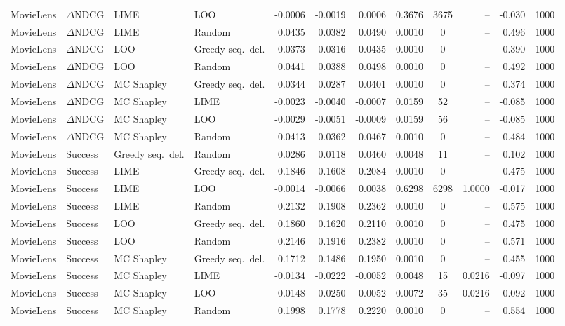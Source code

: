 \begin{longtable}{@{}p{}p{}p{}p{}rrrrcrrr@{}}
MovieLens & $\Delta$NDCG & LIME & LOO & -0.0006 & -0.0019 & 0.0006 & 0.3676 & 3675 & -- & -0.030 & 1000 \\
MovieLens & $\Delta$NDCG & LIME & Random & 0.0435 & 0.0382 & 0.0490 & 0.0010 & 0 & -- & 0.496 & 1000 \\
MovieLens & $\Delta$NDCG & LOO & Greedy seq.\ del. & 0.0373 & 0.0316 & 0.0435 & 0.0010 & 0 & -- & 0.390 & 1000 \\
MovieLens & $\Delta$NDCG & LOO & Random & 0.0441 & 0.0388 & 0.0498 & 0.0010 & 0 & -- & 0.492 & 1000 \\
MovieLens & $\Delta$NDCG & MC Shapley & Greedy seq.\ del. & 0.0344 & 0.0287 & 0.0401 & 0.0010 & 0 & -- & 0.374 & 1000 \\
MovieLens & $\Delta$NDCG & MC Shapley & LIME & -0.0023 & -0.0040 & -0.0007 & 0.0159 & 52 & -- & -0.085 & 1000 \\
MovieLens & $\Delta$NDCG & MC Shapley & LOO & -0.0029 & -0.0051 & -0.0009 & 0.0159 & 56 & -- & -0.085 & 1000 \\
MovieLens & $\Delta$NDCG & MC Shapley & Random & 0.0413 & 0.0362 & 0.0467 & 0.0010 & 0 & -- & 0.484 & 1000 \\
MovieLens & Success & Greedy seq.\ del. & Random & 0.0286 & 0.0118 & 0.0460 & 0.0048 & 11 & -- & 0.102 & 1000 \\
MovieLens & Success & LIME & Greedy seq.\ del. & 0.1846 & 0.1608 & 0.2084 & 0.0010 & 0 & -- & 0.475 & 1000 \\
MovieLens & Success & LIME & LOO & -0.0014 & -0.0066 & 0.0038 & 0.6298 & 6298 & 1.0000 & -0.017 & 1000 \\
MovieLens & Success & LIME & Random & 0.2132 & 0.1908 & 0.2362 & 0.0010 & 0 & -- & 0.575 & 1000 \\
MovieLens & Success & LOO & Greedy seq.\ del. & 0.1860 & 0.1620 & 0.2110 & 0.0010 & 0 & -- & 0.475 & 1000 \\
MovieLens & Success & LOO & Random & 0.2146 & 0.1916 & 0.2382 & 0.0010 & 0 & -- & 0.571 & 1000 \\
MovieLens & Success & MC Shapley & Greedy seq.\ del. & 0.1712 & 0.1486 & 0.1950 & 0.0010 & 0 & -- & 0.455 & 1000 \\
MovieLens & Success & MC Shapley & LIME & -0.0134 & -0.0222 & -0.0052 & 0.0048 & 15 & 0.0216 & -0.097 & 1000 \\
MovieLens & Success & MC Shapley & LOO & -0.0148 & -0.0250 & -0.0052 & 0.0072 & 35 & 0.0216 & -0.092 & 1000 \\
MovieLens & Success & MC Shapley & Random & 0.1998 & 0.1778 & 0.2220 & 0.0010 & 0 & -- & 0.554 & 1000 \\
\end{longtable}
